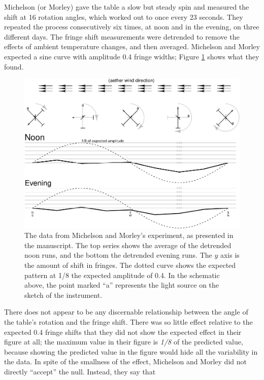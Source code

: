 \documentclass[english,floatsintext,man]{apa6}
\theoremstyle{definition}
\theoremstyle{definition}
\theoremstyle{definition}
\theoremstyle{remark}
\begin{document}
Michelson (or Morley) gave the table a slow but steady spin and measured
the shift at 16 rotation angles, which worked out to once every 23
seconds. They repeated the process consecutively six times, at noon and
in the evening, on three different days. The fringe shift measurements
were detrended to remove the effects of ambient temperature changes, and
then averaged. Michelson and Morley expected a sine curve with amplitude
0.4 fringe widths; Figure \ref{fig:MMdata} shows what they found.

\begin{figure}
\centering
\includegraphics{paper_pdf_files/figure-latex/MMdata-1.pdf}
\caption{\label{fig:MMdata}The data from Michelson and Morley's experiment,
as presented in the manuscript. The top series shows the average of the
detrended noon runs, and the bottom the detrended evening runs. The
\(y\) axis is the amount of shift in fringes. The dotted curve shows the
expected pattern at 1/8 the expected amplitude of 0.4. In the schematic
above, the point marked \enquote{a} represents the light source on the
sketch of the instrument.}
\end{figure}

There does not appear to be any discernable relationship between the
angle of the table's rotation and the fringe shift. There was so little
effect relative to the expected 0.4 fringe shifts that they did not show
the expected effect in their figure at all; the maximum value in their
figure is \emph{1/8} of the predicted value, because showing the
predicted value in the figure would hide all the variability in the
data. In spite of the smallness of the effect, Michelson and Morley did
not directly \enquote{accept} the null. Instead, they say that
\end{document}
